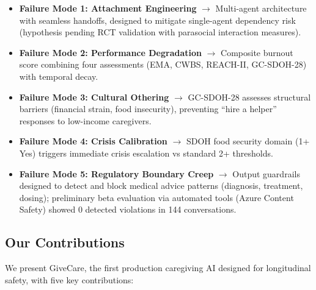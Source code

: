\documentclass{article}
\begin{document}
\begin{itemize}
    \item \textbf{Failure Mode 1: Attachment Engineering} $\rightarrow$ Multi-agent architecture with seamless handoffs, designed to mitigate single-agent dependency risk (hypothesis pending RCT validation with parasocial interaction measures).
    \item \textbf{Failure Mode 2: Performance Degradation} $\rightarrow$ Composite burnout score combining four assessments (EMA, CWBS, REACH-II, GC-SDOH-28) with temporal decay.
    \item \textbf{Failure Mode 3: Cultural Othering} $\rightarrow$ GC-SDOH-28 assesses structural barriers (financial strain, food insecurity), preventing ``hire a helper'' responses to low-income caregivers.
    \item \textbf{Failure Mode 4: Crisis Calibration} $\rightarrow$ SDOH food security domain (1+ Yes) triggers immediate crisis escalation vs standard 2+ thresholds.
    \item \textbf{Failure Mode 5: Regulatory Boundary Creep} $\rightarrow$ Output guardrails designed to detect and block medical advice patterns (diagnosis, treatment, dosing); preliminary beta evaluation via automated tools (Azure Content Safety) showed 0 detected violations in 144 conversations.
\end{itemize}

\subsection{Our Contributions}

We present GiveCare, the first production caregiving AI designed for longitudinal safety, with five key contributions:
\end{document}
